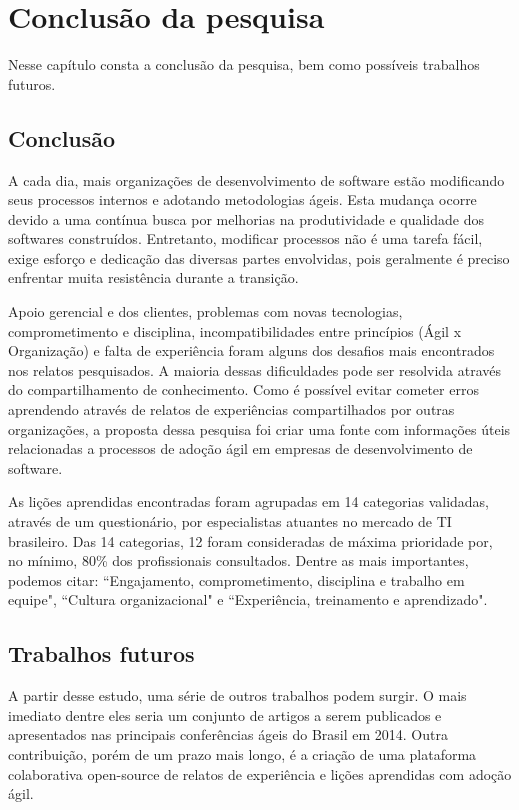 \chapter{Conclusão da pesquisa}

Nesse capítulo consta a conclusão da pesquisa, bem como possíveis trabalhos futuros.

\section{Conclusão}

A cada dia, mais organizações de desenvolvimento de software estão modificando seus processos internos e adotando metodologias ágeis. Esta mudança ocorre devido a uma contínua busca por melhorias na produtividade e qualidade dos softwares construídos. Entretanto, modificar processos não é uma tarefa fácil, exige esforço e dedicação das diversas partes envolvidas, pois geralmente é preciso enfrentar muita resistência durante a transição.

Apoio gerencial e dos clientes, problemas com novas tecnologias, comprometimento e disciplina, incompatibilidades entre princípios (Ágil x Organização) e falta de experiência foram alguns dos desafios mais encontrados nos relatos pesquisados. A maioria dessas dificuldades pode ser resolvida através do compartilhamento de conhecimento. Como é possível evitar cometer erros aprendendo através de relatos de experiências compartilhados por outras organizações, a proposta dessa pesquisa foi criar uma fonte com informações úteis relacionadas a processos de adoção ágil em empresas de desenvolvimento de software.

As lições aprendidas encontradas foram agrupadas em 14 categorias validadas, através de um questionário, por especialistas atuantes no mercado de TI brasileiro. Das 14 categorias, 12 foram consideradas de máxima prioridade por, no mínimo, 80\% dos profissionais consultados. Dentre as mais importantes, podemos citar: ``Engajamento, comprometimento, disciplina e trabalho em equipe", ``Cultura organizacional" e ``Experiência, treinamento e aprendizado".

\section{Trabalhos futuros}

A partir desse estudo, uma série de outros trabalhos podem surgir. O mais imediato dentre eles seria um conjunto de artigos a serem publicados e apresentados nas principais conferências ágeis do Brasil em 2014. Outra contribuição, porém de um prazo mais longo, é a criação de uma plataforma colaborativa open-source de relatos de experiência e lições aprendidas com adoção ágil.
